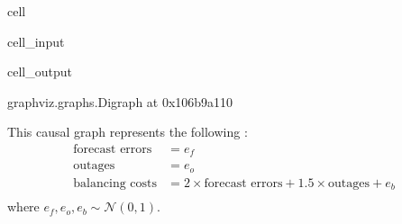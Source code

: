 \documentclass[letterpaper,10pt,english]{jupyterBook}
\begin{document}
\begin{sphinxuseclass}{cell}\begin{sphinxVerbatimInput}

\begin{sphinxuseclass}{cell_input}
\begin{sphinxVerbatim}[commandchars=\\\{\}]
  \PYG{p}{[}\PYG{p}{[}  \PYG{p}{]}
              \PYG{p}{[}  \PYG{p}{]}
              \PYG{p}{[}  \PYG{p}{]}\PYG{p}{]}

 \PYG{p}{[}  \PYG{p}{]}
\end{sphinxVerbatim}

\end{sphinxuseclass}\end{sphinxVerbatimInput}
\begin{sphinxVerbatimOutput}

\begin{sphinxuseclass}{cell_output}
\begin{sphinxVerbatim}[commandchars=\\\{\}]
\PYGZlt{}graphviz.graphs.Digraph at 0x106b9a110\PYGZgt{}
\end{sphinxVerbatim}

\end{sphinxuseclass}\end{sphinxVerbatimOutput}

\end{sphinxuseclass}
\sphinxAtStartPar
This causal graph represents the following :
\label{equation:notebooks/basic_dag_structures:613d3df7-8730-4fd8-ae78-37ef04626241}\begin{align}
\text{forecast errors} &= e_f \\
\text{outages} &= e_o \\
\text{balancing costs} &= 2 \times \text{forecast errors} + 1.5 \times \text{outages} + e_b \\
\end{align}
\sphinxAtStartPar
where \(e_f, e_o, e_b \sim \mathcal{N}(0,1)\).
\end{document}
